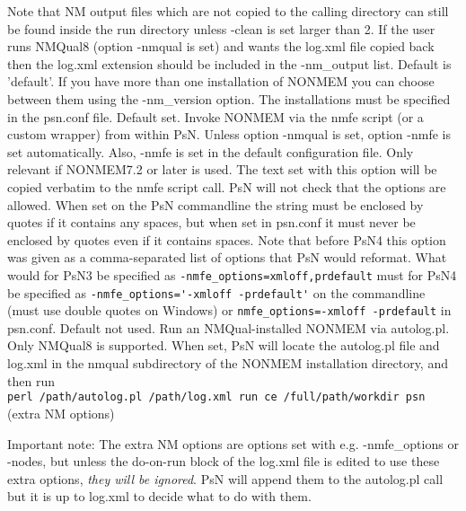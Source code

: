 \begin{optionlist}
Note that NM output files which are not copied to the calling directory can still be found inside the run directory
unless -clean is set larger than 2. If the user runs NMQual8 (option -nmqual is set) and wants the log.xml file copied back then the log.xml extension should be included in the -nm\_output list.
\nextopt
{}
Default is 'default'. If you have more than one installation of NONMEM you can choose between them using the -nm\_version option. The installations must be specified in the psn.conf file. 
\nextopt
{}
Default set.
Invoke NONMEM via the nmfe script (or a custom wrapper) from within PsN. 
Unless option -nmqual is set, option -nmfe is 
set automatically. Also, -nmfe is set in the default configuration file.
\nextopt
{}
Only relevant if NONMEM7.2 or later is used. 
The text set with this option will be copied verbatim to the nmfe script call. PsN will not check that the options are allowed. When set on the PsN commandline the string must be enclosed by quotes if it contains any spaces, but when set in psn.conf it must never be enclosed by quotes even if it contains spaces. 
Note that before PsN4 this option was given as a comma-separated list of options that PsN would reformat. What would for PsN3 be specified as 
\verb|-nmfe_options=xmloff,prdefault| must for PsN4 be specified as \verb|-nmfe_options='-xmloff -prdefault'| on the commandline (must use double quotes on Windows) or 
\verb|nmfe_options=-xmloff -prdefault| in psn.conf.
\nextopt
{}
Default not used. Run an NMQual-installed NONMEM via autolog.pl. Only NMQual8 is supported. 
When set, PsN will locate the autolog.pl file and log.xml in the nmqual subdirectory of the NONMEM installation directory, and then run \\
\verb|perl /path/autolog.pl /path/log.xml run ce /full/path/workdir psn| (extra NM options)

Important note: The extra NM options are options set with e.g. -nmfe\_options or -nodes, but unless the
do-on-run block of the log.xml file is edited to use these extra options, 
\emph{they will be ignored}. PsN will append them to the autolog.pl call but it is up to log.xml to decide what to do with them.


\end{optionlist}
